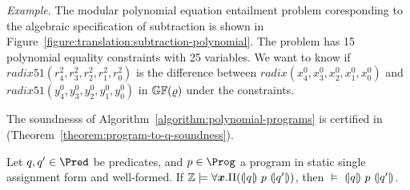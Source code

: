 \noindent
\emph{Example}.
The modular polynomial equation entailment problem coresponding to the
algebraic specification of subtraction is shown in
Figure~\ref{figure:translation:subtraction-polynomial}. The problem
has 15 polynomial equality constraints with 25 variables. We 
want to know if $\mathit{radix51}({r}^2_4, {r}^2_3, {r}^2_2,
{r}^2_1, {r}^2_0)$ is the difference between $\mathit{radix}({x}^0_4,
{x}^0_3, {x}^0_2, {x}^0_1, {x}^0_0)$ and $\mathit{radix51}({y}^0_4,
{y}^0_3, {y}^0_2, {y}^0_1, {y}^0_0)$ in $\mathbb{GF}(\varrho)$ under the
constraints. 

The soundnesss of Algorithm~\ref{algorithm:polynomial-programs}
is certified in \coq (Theorem~\ref{theorem:program-to-q-soundness}).
\begin{theorem}
  \label{theorem:program-to-q-soundness}
  Let $q, q' \in \Pred$ be predicates, and $p \in \Prog$ a program in
  static single assignment form and well-formed. 
  If $\bbfZ \models \forall \vx.\Pi(\hoaretriple{q}{p}{q'})$, then
  $\models$ ${(\!|}{q}{|\!)}~{p}~{(\!|}{q'}{|\!)}$.
\end{theorem}

